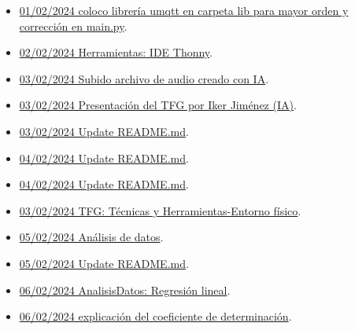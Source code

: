 \begin{itemize}
\item \href{https://github.com/JLCaballeroMQ/Proyecto_TFG_UBU_23_24/tree/22a12b0a25fa4e792c030637e6490f2f9276f705}{01/02/2024 coloco librería umqtt en carpeta lib para mayor orden y corrección en main.py}.
\item \href{https://github.com/JLCaballeroMQ/Proyecto_TFG_UBU_23_24/tree/b70c9e9197665be76cad4f07f6a6c182d611207f}{02/02/2024 Herramientas: IDE Thonny}.
\item \href{https://github.com/JLCaballeroMQ/Proyecto_TFG_UBU_23_24/tree/f64843c54ee473669324fe46a51ddee6b97479fb}{03/02/2024 Subido archivo de audio creado con IA}.
\item \href{https://github.com/JLCaballeroMQ/Proyecto_TFG_UBU_23_24/tree/f0f77e335f32336978b3ee8d012efe640b717f12}{03/02/2024 Presentación del TFG por Iker Jiménez (IA)}.
\item \href{https://github.com/JLCaballeroMQ/Proyecto_TFG_UBU_23_24/tree/59790ad1f3a543e65b6dbed5179e604e3243ddcd}{03/02/2024 Update README.md}.
\item \href{https://github.com/JLCaballeroMQ/Proyecto_TFG_UBU_23_24/tree/9234e88b6dbb711a7f128af5228791b654be191f}{04/02/2024 Update README.md}.
\item \href{https://github.com/JLCaballeroMQ/Proyecto_TFG_UBU_23_24/tree/a491a513c4f3f1e65bfd4e45ce22cffca07350d1}{04/02/2024 Update README.md}.
\item \href{https://github.com/JLCaballeroMQ/Proyecto_TFG_UBU_23_24/tree/d9b434ba7fd0a6bef528f597f8db4a726a77240b}{03/02/2024 TFG: Técnicas y Herramientas-Entorno físico}.
\item \href{https://github.com/JLCaballeroMQ/Proyecto_TFG_UBU_23_24/tree/c95cdd4c0a8d6d0ba186a4f2dc5a7986bcb5b149}{05/02/2024 Análisis de datos}.
\item \href{https://github.com/JLCaballeroMQ/Proyecto_TFG_UBU_23_24/tree/0f4b86e39233f90fcd8ba056cf9d88e28b93a4a0}{05/02/2024 Update README.md}.
\item \href{https://github.com/JLCaballeroMQ/Proyecto_TFG_UBU_23_24/tree/e3c9d3b67ca4d06f65f1943e69b34ab7513ffbf5}{06/02/2024 AnalisisDatos: Regresión lineal}.
\item \href{https://github.com/JLCaballeroMQ/Proyecto_TFG_UBU_23_24/tree/293cc1705e30517610429b80e32bb6122e7fd3a2}{06/02/2024 explicación del coeficiente de determinación}.

\end{itemize}
